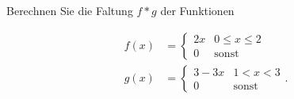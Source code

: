 
\begin{exercise}

Berechnen Sie die Faltung $f \ast g$ der Funktionen

\begin{align*}
    f(x)
    & =
    \begin{cases}
        2 x & 0 \leq x \leq 2 \\
        0   & \text{sonst}
    \end{cases} \\
    g(x)
    & =
    \begin{cases}
        3 - 3 x & 1 < x < 3 \\
        0       & \text{sonst}
    \end{cases}.
\end{align*}

\end{exercise}


